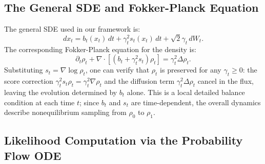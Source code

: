 \documentclass{article}
\theoremstyle{plain}
\theoremstyle{definition}
\theoremstyle{remark}
\begin{document}
\subsection{The General SDE and Fokker-Planck Equation}

The general SDE used in our framework is:
\begin{equation}
    dx_t = b_t(x_t)\,dt + \gamma_t^2 s_t(x_t)\,dt + \sqrt{2}\gamma_t\,dW_t.
\end{equation}
The corresponding Fokker-Planck equation for the density is:
\begin{equation}
    \partial_t \rho_t + \nabla \cdot \left[ (b_t + \gamma_t^2 s_t) \rho_t \right] = \gamma_t^2 \Delta \rho_t.
\end{equation}
Substituting $s_t = \nabla \log \rho_t$, one can verify that $\rho_t$ is preserved for any $\gamma_t \geq 0$: the score correction $\gamma_t^2 s_t \rho_t = \gamma_t^2 \nabla \rho_t$ and the diffusion term $\gamma_t^2 \Delta \rho_t$ cancel in the flux, leaving the evolution determined by $b_t$ alone. This is a local detailed balance condition at each time $t$; since $b_t$ and $s_t$ are time-dependent, the overall dynamics describe nonequilibrium sampling from $\rho_0$ to $\rho_1$.

\subsection{Likelihood Computation via the Probability Flow ODE}
\label{app:like}
\end{document}
